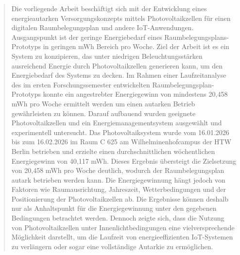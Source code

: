 \documentclass{article}
\begin{document}
\thispagestyle{empty}


\thispagestyle{empty}

\renewcommand{\abstractname}{Abstract}
\begin{abstract}
Die vorliegende Arbeit beschäftigt sich mit der Entwicklung eines energieautarken Versorgungskonzepts mittels Photovoltaikzellen 
für einen digitalen Raumbelegungsplan und andere IoT-Anwendungen. Ausgangspunkt ist der geringe Energiebedarf eines 
Raumbelegungsplans-Prototyps in geringen mWh Bereich pro Woche. Ziel der Arbeit ist es ein System zu konzipieren, das 
unter niedrigen Beleuchtungsstärken ausreichend Energie durch Photovoltaikzellen generieren kann, um den Energiebedarf des 
Systems zu decken.
Im Rahmen einer Laufzeitanalyse des im ersten Forschungssemester entwickelten Raumbelegungsplan-Prototyps konnte ein angestrebter 
Energiegewinn von mindestens 20,458 mWh pro Woche ermittelt werden um einen autarken Betrieb gewährleisten zu können. Darauf aufbauend 
wurden geeignete Photovoltaikzellen und ein Energiemanagementsystem ausgewählt und experimentell untersucht. 
Das Photovoltaiksystem wurde vom 16.01.2026 bis zum 16.02.2026 im Raum C 625 am Wilhelminenhofcampus der HTW Berlin betrieben und 
erzielte einen durchschnittlichen wöchentlichen Energiegewinn von 40,117 mWh. Dieses Ergebnis übersteigt 
die Zielsetzung von 20,458 mWh pro Woche deutlich, wodurch der Raumbelegungsplan autark betrieben werden kann. Die Energiegewinnung 
hängt jedoch von Faktoren wie Raumausrichtung, Jahreszeit, Wetterbedingungen und der Positionierung der Photovoltaikzellen ab. Die 
Ergebnisse können deshalb nur als Anhaltspunkt für die Energiegewinnung unter den gegebenen Bedingungen betrachtet werden. 
Dennoch zeigte sich, dass die Nutzung von Photovoltaikzellen unter Innenlichtbedingungen eine vielversprechende 
Möglichkeit darstellt, um die Laufzeit von energieeffizienten IoT-Systemen zu verlängern oder sogar eine vollständige 
Autarkie zu ermöglichen.
\end{abstract}
\newpage


\cleardoublepage
{}

\tableofcontents

\newpage

\listoffigures

\listoftables

\end{document}
